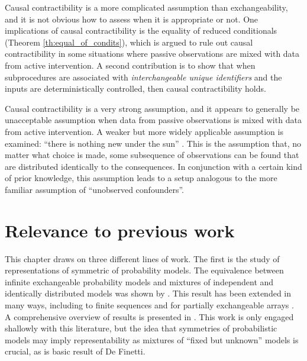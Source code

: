 Causal contractibility is a more complicated assumption than exchangeability, and it is not obvious how to assess when it is appropriate or not. One implications of causal contractibility is the equality of reduced conditionals (Theorem \ref{th:equal_of_condits}), which is argued to rule out causal contractibility in some situations where passive observations are mixed with data from active intervention. A second contribution is to show that when subprocedures are associated with \emph{interchangeable unique identifiers} and the inputs are deterministically controlled, then causal contractibility holds.

Causal contractibility is a very strong assumption, and it appears to generally be unacceptable assumption when data from passive observations is mixed with data from active intervention. A weaker but more widely applicable assumption is examined: ``there is nothing new under the sun'' . This is the assumption that, no matter what choice is made, some subsequence of observations can be found that are distributed identically to the consequences. In conjunction with a certain kind of prior knowledge, this assumption leads to a setup analogous to the more familiar assumption of ``unobserved confounders''.

\section{Relevance to previous work}

This chapter draws on three different lines of work. The first is the study of representations of symmetric of probability models. The equivalence between infinite exchangeable probability models and mixtures of independent and identically distributed models was shown by \cite{de_finetti_foresight_1992}. This result has been extended in many ways, including to finite sequences \citet{kerns_definettis_2006,diaconis_finite_1980} and for partially exchangeable arrays \citet{aldous_representations_1981}. A comprehensive overview of results is presented in \citet{kallenberg_probabilistic_2005}. This work is only engaged shallowly with this literature, but the idea that symmetries of probabilistic models may imply representability as mixtures of ``fixed but unknown'' models is crucial, as is basic result of De Finetti.

